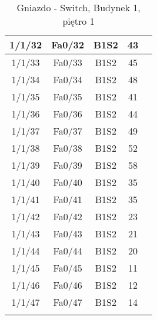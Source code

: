 \begin{center}
\begin{longtable}{|c|c|c|c|c|}
	1/1/32 & Fa0/32 & B1S2 & 43 \\ \hline
	1/1/33 & Fa0/33 & B1S2 & 45 \\ \hline
	1/1/34 & Fa0/34 & B1S2 & 48 \\ \hline
	1/1/35 & Fa0/35 & B1S2 & 41 \\ \hline
	1/1/36 & Fa0/36 & B1S2 & 44 \\ \hline
	1/1/37 & Fa0/37 & B1S2 & 49 \\ \hline
	1/1/38 & Fa0/38 & B1S2 & 52 \\ \hline
	1/1/39 & Fa0/39 & B1S2 & 58 \\ \hline
	1/1/40 & Fa0/40 & B1S2 & 35 \\ \hline
	1/1/41 & Fa0/41 & B1S2 & 35 \\ \hline
	1/1/42 & Fa0/42 & B1S2 & 23 \\ \hline
	1/1/43 & Fa0/43 & B1S2 & 21 \\ \hline
	1/1/44 & Fa0/44 & B1S2 & 20 \\ \hline
	1/1/45 & Fa0/45 & B1S2 & 11 \\ \hline
	1/1/46 & Fa0/46 & B1S2 & 12 \\ \hline
	1/1/47 & Fa0/47 & B1S2 & 14 \\ \hline
\caption{Gniazdo - Switch, Budynek 1, piętro 1}\\
    \end{longtable}
\end{center}


